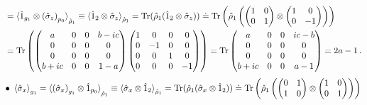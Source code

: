 \documentclass[11pt]{article}
\numberwithin{equation}{section} %
\numberwithin{figure}{section} %
\begin{document}
\begin{appendices}
\begin{equation}
\begin{split}
 &=\braket{\hat{1}_{g_1}\otimes\left(\hat{\sigma}_z\right)_{p_0}}_{\hat{\rho}_1} \equiv\braket{\hat{1}_2\otimes\hat{\sigma}_z}_{\hat{\rho}_1}=\textrm{Tr}(\hat{\rho}_{1}(\hat{1}_2\otimes\hat{\sigma}_z))\doteq \textrm{Tr}\begin{pmatrix}\hat{\rho}_{1}\begin{pmatrix}\begin{pmatrix}1&0\\0&1\end{pmatrix}\otimes\begin{pmatrix}1&0\\0&-1\end{pmatrix}\end{pmatrix}\end{pmatrix}\\
 &=\textrm{Tr}\begin{pmatrix}\begin{pmatrix}a&0&0&b-ic\\0&0&0&0\\0&0&0&0\\b+ic&0&0&1-a\end{pmatrix}\begin{pmatrix}1&0&0&0\\0&-1&0&0\\0&0&1&0\\0&0&0&-1\end{pmatrix}\end{pmatrix}=\textrm{Tr}\begin{pmatrix}a&0&0&ic-b\\0&0&0&0\\0&0&0&0\\b+ic&0&0&a-1\end{pmatrix}=2a-1\,\textrm{.}
\end{split}
\end{equation}
\begin{equation} \label{sigmax_otimes_one_appendix}
\begin{split}
 \bullet\,\,\braket{\hat{\sigma}_x}_{g_1}
 &= \braket{ \left(\hat{\sigma}_x\right)_{g_1}\otimes \hat{1}_{p_0}}_{\hat{\rho}_1} \equiv\braket{\hat{\sigma}_x\otimes\hat{1}_2}_{\hat{\rho}_1}=\textrm{Tr}(\hat{\rho}_{1}(\hat{\sigma}_x\otimes\hat{1}_2))\doteq \textrm{Tr}\begin{pmatrix}\hat{\rho}_{1}\begin{pmatrix}\begin{pmatrix}0&1\\1&0\end{pmatrix}\otimes\begin{pmatrix}1&0\\0&1\end{pmatrix}\end{pmatrix}\end{pmatrix}\\

\end{split}
\end{equation}
\end{appendices}
\end{document}
